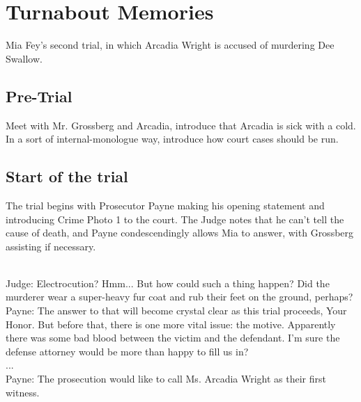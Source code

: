 \section{Turnabout Memories}

Mia Fey's second trial, in which Arcadia Wright is accused of murdering Dee Swallow. 

\subsection{Pre-Trial}

Meet with Mr. Grossberg and Arcadia, introduce that Arcadia is sick with a cold. In a sort of internal-monologue way, introduce how court cases should be run.

\subsection{Start of the trial}
The trial begins with Prosecutor Payne making his opening statement and introducing Crime Photo 1 to the court. The Judge notes that he can't tell the cause of death, and Payne condescendingly allows Mia to answer, with Grossberg assisting if necessary.\\
\\
\begin{center}
Judge: Electrocution? Hmm... But how could such a thing happen? Did the murderer wear a super-heavy fur coat and rub their feet on the ground, perhaps?\\
Payne: The answer to that will become crystal clear as this trial proceeds, Your Honor. But before that, there is one more vital issue: the motive. Apparently there was some bad blood between the victim and the defendant. I'm sure the defense attorney would be more than happy to fill us in?\\
...\\
Payne: The prosecution would like to call Ms. Arcadia Wright as their first witness. \\
\end{center}

